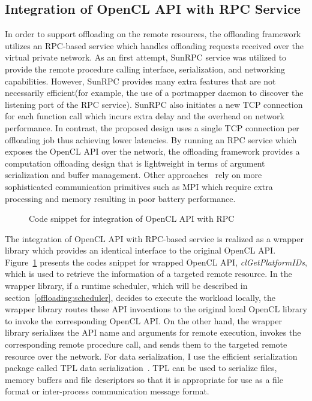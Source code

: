 \subsection{Integration of OpenCL API with RPC Service}
\label{offloading:rpc}
%
In order to support offloading on the remote resources, the offloading
framework utilizes an RPC-based service which handles offloading
requests received over the virtual private network.
%
As an first attempt, SunRPC service was utilized to provide the remote
procedure calling interface, serialization, and networking capabilities.
%
However, SunRPC provides many extra features that are not necessarily
efficient(for example, the use of a portmapper daemon to discover the
listening port of the RPC service).
%
SunRPC also initiates a new TCP connection for each function call which
incurs extra delay and the overhead on network performance.
%
In contrast, the proposed design uses a single TCP connection per
offloading job thus achieving lower latencies.
%
By running an RPC service which exposes the OpenCL API over the network,
the offloading framework provides a computation offloading design that
is lightweight in terms of argument serialization and buffer management.
%
Other approaches~\cite{vocl} rely on more sophisticated communication
primitives such as MPI which require extra processing and memory
resulting in poor battery performance.\\
%
\begin{figure}
\centering
{}
\caption{Code snippet for integration of OpenCL API with RPC}
\label{fig:code_rpc}
\end{figure}
%
The integration of OpenCL API with RPC-based service is realized as a
wrapper library which provides an identical interface to the original
OpenCL API.
%
Figure~\ref{fig:code_rpc} presents the codes snippet for wrapped
OpenCL API, {\it{clGetPlatformIDs}}, which is used to retrieve the
information of a targeted remote resource.
%
In the wrapper library, if a runtime scheduler, which will be described
in section~\ref{offloading:scheduler}, decides to execute the workload
locally, the wrapper library routes these API invocations to the original
local OpenCL library to invoke the corresponding OpenCL API.
%
On the other hand, the wrapper library serializes the API name and
arguments for remote execution, invokes the corresponding remote procedure
call, and sends them to the targeted remote resource over the network.
%
For data serialization, I use the efficient serialization package called
TPL data serialization~\cite{tpl}.
%
TPL can be used to serialize files, memory buffers and file descriptors
so that it is appropriate for use as a file format or inter-process
communication message format.
%

